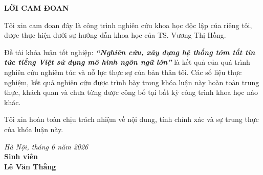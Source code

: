 
\begin{center}
  \textbf{\large{LỜI CAM ĐOAN}}
\end{center}

Tôi xin cam đoan đây là công trình nghiên cứu khoa học độc lập của riêng tôi, được thực
hiện dưới sự hướng dẫn khoa học của TS. Vương Thị Hồng.

Đề tài khóa luận tốt nghiệp: \textbf{\textit{``Nghiên cứu, xây dựng hệ thống tóm tắt tin tức tiếng Việt sử dụng mô hình ngôn ngữ lớn''}} là kết quả của quá trình nghiên
cứu nghiêm túc và nỗ lực thực sự của bản thân tôi. Các số liệu thực nghiệm, kết quả
nghiên cứu được trình bày trong khóa luận này hoàn toàn trung thực, khách quan và chưa
từng được công bố tại bất kỳ công trình khoa học nào khác.

Tôi xin hoàn toàn chịu trách nhiệm về nội dung, tính chính xác và sự trung thực của
khóa luận này.

\vspace{1cm}
\begin{flushright}
  \begin{minipage}{8cm}
    \centering
    \textit{Hà Nội, tháng 6 năm 2026}\\[0.2cm]
    \textbf{Sinh viên}\\[2.5cm]

    \textbf{Lê Văn Thắng}
  \end{minipage}
\end{flushright}
